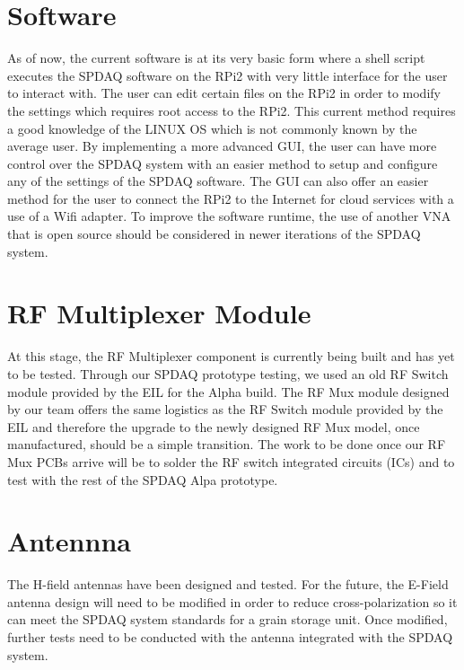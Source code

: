 \section{Software}

As of now, the current software is at its very basic form where a shell script executes the SPDAQ software on the RPi2 with
very little interface for the user to interact with.  The user can edit certain files on the RPi2 in order to modify the
settings which requires root access to the RPi2. This current method requires a good knowledge of the LINUX OS which is not
commonly known by the average user.  By implementing a more advanced GUI, the user can have more control over the SPDAQ
system with an easier method to setup and configure any of the settings of the SPDAQ software.  The GUI can also offer an
easier method for the user to connect the RPi2 to the Internet for cloud services with a use of a Wifi adapter. To improve the software runtime, the use of another VNA that is open source should be considered in newer iterations of the SPDAQ system.

\section{RF Multiplexer Module}

At this stage, the RF Multiplexer component is currently being built and has yet to be tested.  Through our SPDAQ prototype testing, we used an old RF Switch module provided by the EIL for the Alpha build.  The RF Mux module designed by our team offers the same logistics as the RF Switch module provided by the EIL and therefore the upgrade to the newly designed RF Mux model, once manufactured, should be a simple transition.  The work to be done once our RF Mux PCBs arrive will be to solder the RF switch integrated circuits (ICs) and to test with the rest of the SPDAQ Alpa prototype.

\section{Antennna}

The H-field antennas have been designed and tested. For the future, the E-Field antenna design will need to be modified in order to reduce cross-polarization so it can meet the SPDAQ system standards for a grain storage unit.  Once modified, further tests need to be conducted with the antenna integrated with the SPDAQ system.
